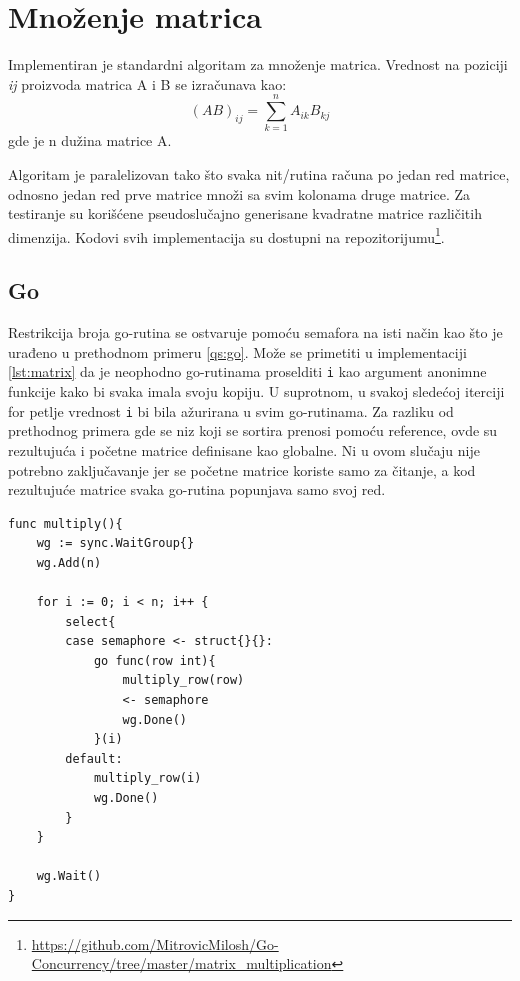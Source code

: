 \documentclass[12pt,oneside]{memoir}
\begin{document}

\section{Množenje matrica}
Implementiran je standardni algoritam za množenje matrica. Vrednost na poziciji \textit{ij} proizvoda matrica A i B se izračunava kao: $$(AB)_{ij} = \sum_{k=1}^{n} A_{ik}B_{kj}$$ gde je n dužina matrice A. 

Algoritam je paralelizovan tako što svaka nit/rutina računa po jedan red matrice, odnosno jedan red prve matrice množi sa svim kolonama druge matrice. Za testiranje su korišćene pseudoslučajno generisane kvadratne matrice različitih dimenzija. Kodovi svih implementacija su dostupni na repozitorijumu\footnote{\url{https://github.com/MitrovicMilosh/Go-Concurrency/tree/master/matrix_multiplication}}.

\subsection{Go}
Restrikcija broja go-rutina se ostvaruje pomoću semafora na isti način kao što je urađeno u prethodnom primeru \ref{qs:go}. Može se primetiti u implementaciji \ref{lst:matrix} da je neophodno go-rutinama  proselditi \texttt{i} kao argument anonimne funkcije kako bi svaka imala svoju kopiju. U suprotnom, u svakoj sledećoj iterciji for petlje vrednost \texttt{i} bi bila ažurirana u svim go-rutinama. Za razliku od prethodnog primera gde se niz koji se sortira prenosi pomoću reference, ovde su rezultujuća i početne matrice definisane kao globalne. Ni u ovom slučaju nije potrebno zaključavanje jer se početne matrice koriste samo za čitanje, a kod rezultujuće matrice svaka go-rutina popunjava samo svoj red. 

\begin{center}
\begin{lstlisting}[caption=Go implementacija konkurentne funkcije za množenje matrica,label={lst:matrix},float, backgroundcolor=\color{background}]
func multiply(){
	wg := sync.WaitGroup{}
	wg.Add(n)

	for i := 0; i < n; i++ {
		select{
		case semaphore <- struct{}{}:
			go func(row int){
				multiply_row(row)
				<- semaphore
				wg.Done()
			}(i)
		default:
			multiply_row(i)
			wg.Done()
		}
	}

	wg.Wait()
}
\end{lstlisting}
\end{center}
\end{document}
